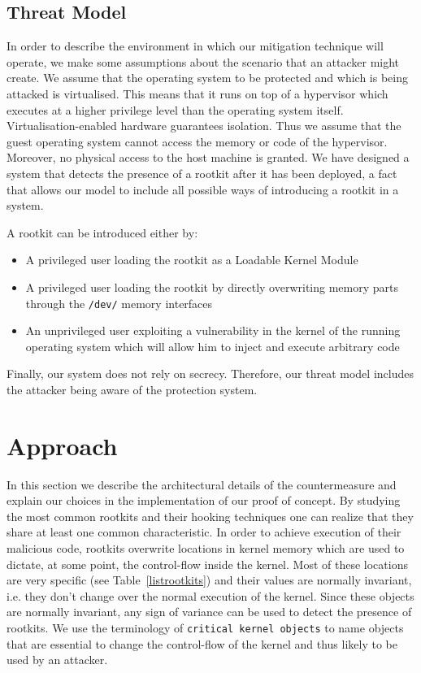 \subsection{Threat Model}
In order to describe the environment in which our mitigation technique will operate, we make some assumptions about the scenario that an attacker might create. We assume that the operating system to be protected and which is being attacked is virtualised. This means that it runs on top of a hypervisor which executes at a higher privilege level than the operating system itself. Virtualisation-enabled hardware guarantees isolation. Thus we assume that the guest operating system cannot access the memory or code of the hypervisor. 
Moreover, no physical access to the host machine is granted.
We have designed a system that detects the presence of a rootkit after it has been deployed, a fact that allows our model to include all possible ways of introducing a rootkit in a system. 

A rootkit can be introduced either by: 

\begin{itemize}
\item A privileged user loading the rootkit as a Loadable Kernel Module
\item A privileged user loading the rootkit by directly overwriting memory parts through the \texttt{/dev/} memory interfaces
\item An unprivileged user exploiting a vulnerability in the kernel of the running operating system which will allow him to inject and execute arbitrary code
\end{itemize}

Finally, our system does not rely on secrecy. Therefore, our threat model includes the attacker being aware of the protection system.


\section{Approach}\label{hr:approach}
In this section we describe the architectural details of the countermeasure and explain our choices in the implementation of our proof of concept.
By studying the most common rootkits and their hooking techniques one can realize that they share at least one common characteristic. In order to achieve execution of their malicious code, rootkits overwrite locations in kernel memory which are used to dictate, at some point, the control-flow inside the kernel. 
Most of these locations are very specific (see Table~\ref{listrootkits}) and their values are normally invariant, i.e. they don't change over the normal execution of the kernel. Since these objects are normally invariant, any sign of variance can be used to detect the presence of rootkits. We use the terminology of \texttt{critical kernel objects} to name objects that are essential to change the control-flow of the kernel and thus likely to be used by an attacker. 


